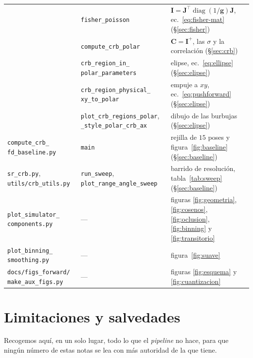 \documentclass[11pt,a4paper]{article}
\newcommand{\vect}[1]{\boldsymbol{#1}}
\newcommand{\matr}[1]{\mathbf{#1}}
\newcommand{\code}[1]{\texttt{#1}}
\theoremstyle{definition}
\theoremstyle{plain}
\begin{document}
{\begin{longtable}{@{}L{3.5cm}L{5.9cm}L{5.9cm}@{}}
& \code{fisher\_poisson} &
  $\matr I=\matr J^\top\!\operatorname{diag}(1/\vect g)\matr J$,
  ec.~\eqref{eq:fisher-mat} (\S\ref{sec:fisher}) \\
& \code{compute\_crb\_polar} &
  $\matr C=\matr I^{+}$, las $\sigma$ y la correlación (\S\ref{sec:crb}) \\
& \code{crb\_region\_in\_} \code{polar\_parameters} &
  elipse, ec.~\eqref{eq:ellipse} (\S\ref{sec:elipse}) \\
& \code{crb\_region\_physical\_} \code{xy\_to\_polar} &
  empuje a $xy$, ec.~\eqref{eq:pushforward} (\S\ref{sec:elipse}) \\
& \code{plot\_crb\_regions\_polar}, \code{\_style\_polar\_crb\_ax} &
  dibujo de las burbujas (\S\ref{sec:elipse}) \\
\addlinespace
\code{compute\_crb\_} \code{fd\_baseline.py} & \code{main} &
  rejilla de $15$ poses y figura~\ref{fig:baseline} (\S\ref{sec:baseline}) \\
\code{sr\_crb.py}, \code{utils/crb\_utils.py} &
  \code{run\_sweep}, \code{plot\_range\_angle\_sweep} &
  barrido de resolución, tabla~\ref{tab:sweep} (\S\ref{sec:baseline}) \\
\addlinespace
\code{plot\_simulator\_} \code{components.py} & --- &
  figuras \ref{fig:geometria}, \ref{fig:cosenos}, \ref{fig:oclusion},
  \ref{fig:binning} y \ref{fig:transitorio} \\
\code{plot\_binning\_} \code{smoothing.py} & --- &
  figura~\ref{fig:suave} \\
\code{docs/figs\_forward/} \code{make\_aux\_figs.py} & --- &
  figuras \ref{fig:esquema} y \ref{fig:cuantizacion} \\
\bottomrule
\end{longtable}}

\section{Limitaciones y salvedades}
\label{sec:limitaciones}

Recogemos aquí, en un solo lugar, todo lo que el \emph{pipeline} no hace, para
que ningún número de estas notas se lea con más autoridad de la que tiene.
\end{document}

